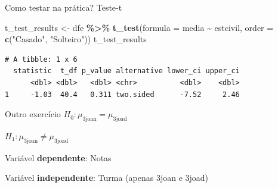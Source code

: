 \documentclass[
  9pt,
  ignorenonframetext,
  aspectratio=169]{beamer}
\newenvironment{Shaded}{\begin{snugshade}}{\end{snugshade}}
\newcommand{\DataTypeTok}[1]{\textcolor[rgb]{0.13,0.29,0.53}{#1}}
\newcommand{\KeywordTok}[1]{\textcolor[rgb]{0.13,0.29,0.53}{\textbf{#1}}}
\newcommand{\NormalTok}[1]{#1}
\newcommand{\OperatorTok}[1]{\textcolor[rgb]{0.81,0.36,0.00}{\textbf{#1}}}
\newcommand{\StringTok}[1]{\textcolor[rgb]{0.31,0.60,0.02}{#1}}
\begin{document}
\begin{frame}[fragile]{Como testar na prática? Teste-t}
\protect\hypertarget{como-testar-na-pruxe1tica-teste-t}{}
\begin{Shaded}
\begin{Highlighting}[]
\NormalTok{t\_test\_results \textless{}{-}}\StringTok{ }\NormalTok{dfe }\OperatorTok{\%\textgreater{}\%}
\StringTok{  }\KeywordTok{t\_test}\NormalTok{(}\DataTypeTok{formula =}\NormalTok{ media }\OperatorTok{\textasciitilde{}}\StringTok{ }\NormalTok{estcivil,}
         \DataTypeTok{order =} \KeywordTok{c}\NormalTok{(}\StringTok{"Casado"}\NormalTok{, }\StringTok{"Solteiro"}\NormalTok{))}
\NormalTok{t\_test\_results}
\end{Highlighting}
\end{Shaded}

\begin{verbatim}
# A tibble: 1 x 6
  statistic  t_df p_value alternative lower_ci upper_ci
      <dbl> <dbl>   <dbl> <chr>          <dbl>    <dbl>
1     -1.03  40.4   0.311 two.sided      -7.52     2.46
\end{verbatim}
\end{frame}

\begin{frame}{Outro exercício}
\protect\hypertarget{outro-exercuxedcio}{}
\(H_0:\mu_\text{3joan} = \mu_\text{3joad}\)

\(H_1:\mu_\text{3joan} \neq \mu_\text{3joad}\)

Variável \textbf{dependente}: Notas

Variável \textbf{independente}: Turma (apenas 3joan e 3joad)
\end{frame}
\end{document}
